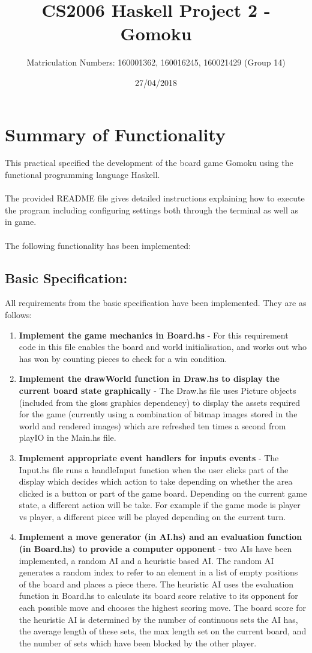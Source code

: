\documentclass[11]{article}
\title{CS2006 Haskell Project 2 - \\ Gomoku}
\date{27/04/2018}
\author{Matriculation Numbers: 160001362, 160016245, 160021429 (Group 14)}
\begin{document}
	\maketitle
	\newpage
	\tableofcontents
	
	\newpage
	\section{Summary of Functionality}
		This practical specified the development of the board game Gomoku using the functional programming language Haskell. \\\\The provided README file gives detailed instructions explaining how to execute the program including configuring settings both through the terminal as well as in game.
\\\\The following functionality has been implemented:
	\subsection{Basic Specification:}
		All requirements from the basic specification have been implemented. They are as follows:	
		\begin{enumerate}
			\item \textbf{Implement the game mechanics in Board.hs} - For this requirement code in this file enables the board and world initialisation, and works out who has won by counting pieces to check for a win condition.
			\item \textbf{Implement the drawWorld function in Draw.hs to display the current board state graphically} - The Draw.hs file uses Picture objects (included from the gloss graphics dependency) to display the assets required for the game (currently using a combination of bitmap images stored in the world and rendered images) which are refreshed ten times a second from playIO in the Main.hs file.
			\item \textbf{Implement appropriate event handlers for inputs events} - The Input.hs file runs a handleInput function when the user clicks part of the display which decides which action to take depending on whether the area clicked is a button or part of the game board. Depending on the current game state, a different action will be take. For example if the game mode is player vs player, a different piece will be played depending on the current turn.
			\item \textbf{Implement a move generator (in AI.hs) and an evaluation function (in Board.hs) to provide a computer opponent} - two AIs have been implemented, a random AI and a heuristic based AI. The random AI generates a random index to refer to an element in a list of empty positions of the board and places a piece there. The heuristic AI uses the evaluation function in Board.hs to calculate its board score relative to its opponent for each possible move and chooses the highest scoring move. The board score for the heuristic AI is determined by the number of continuous sets the AI has, the average length of these sets, the max length set on the current board, and the number of sets which have been blocked by the other player.
		\end{enumerate}
	
\end{document}
